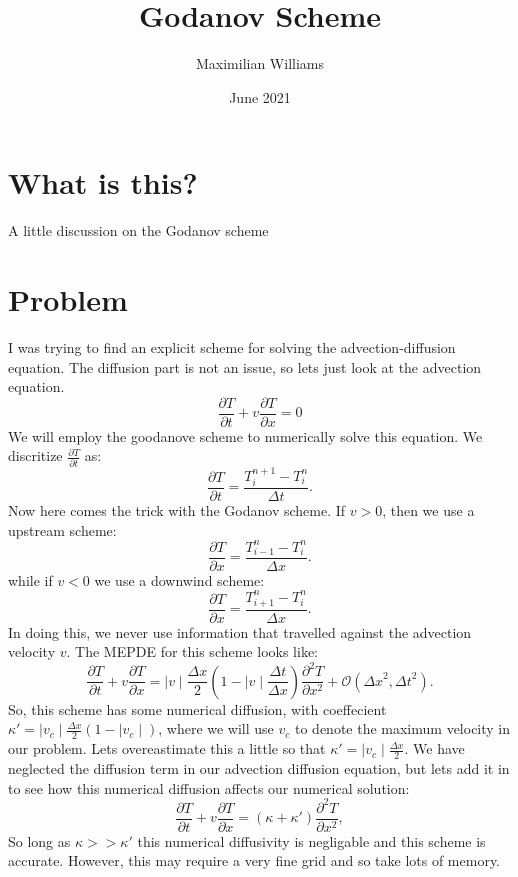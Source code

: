 \documentclass{article}
\title{Godanov Scheme}
\author{Maximilian Williams}
\date{June 2021}
\begin{document}
\maketitle

\section*{What is this?}
A little discussion on the Godanov scheme

\section*{Problem}
I was trying to find an explicit scheme for solving the advection-diffusion equation. The diffusion part is not an issue, so lets just look at the advection equation.
\begin{equation}
	\frac{\partial T}{\partial t} + v \frac{\partial T}{\partial x} = 0
\end{equation}
We will employ the goodanove scheme to numerically solve this equation. We discritize $\frac{\partial T}{\partial t}$ as:
\begin{equation}
	\frac{\partial T}{\partial t} = \frac{T^{n+1}_{i} - T^{n}_{i}}{\Delta t}.
\end{equation}
Now here comes the trick with the Godanov scheme. If $v>0$, then we use a upstream scheme:
\begin{equation}
	\frac{\partial T}{\partial x} = \frac{T^{n}_{i-1} - T^{n}_{i}}{\Delta x}.
\end{equation}
while if $v<0$ we use a downwind scheme:
\begin{equation}
	\frac{\partial T}{\partial x} = \frac{T^{n}_{i+1} - T^{n}_{i}}{\Delta x}.
\end{equation}
In doing this, we never use information that travelled against the advection velocity $v$. The MEPDE for this scheme looks like:
\begin{equation}
	\frac{\partial T}{\partial t} + v \frac{\partial T}{\partial x} = \mid v \mid \frac{\Delta x}{2} (1 - \mid v \mid  \frac{\Delta t}{\Delta x}) \frac{\partial^2 T}{\partial x^2} + \mathcal{O}({\Delta x}^2, {\Delta t}^2 ).
\end{equation}
So, this scheme has some numerical diffusion, with coeffecient $\kappa' = \mid v_c \mid \frac{\Delta x}{2} (1 - \mid v_c \mid) $, where we will use $v_c$ to denote the maximum velocity in our problem. Lets overeastimate this a little so that $\kappa' = \mid v_c \mid \frac{\Delta x}{2}$. We have neglected the diffusion term in our advection diffusion equation, but lets add it in to see how this numerical diffusion affects our numerical solution:
\begin{equation}
	\frac{\partial T}{\partial t} + v \frac{\partial T}{\partial x} = (\kappa + \kappa') \frac{\partial^2 T}{\partial x^2},
\end{equation}
So long as $\kappa >> \kappa'$ this numerical diffusivity is negligable and this scheme is accurate. However, this may require a very fine grid and so take lots of memory.
\end{document}
